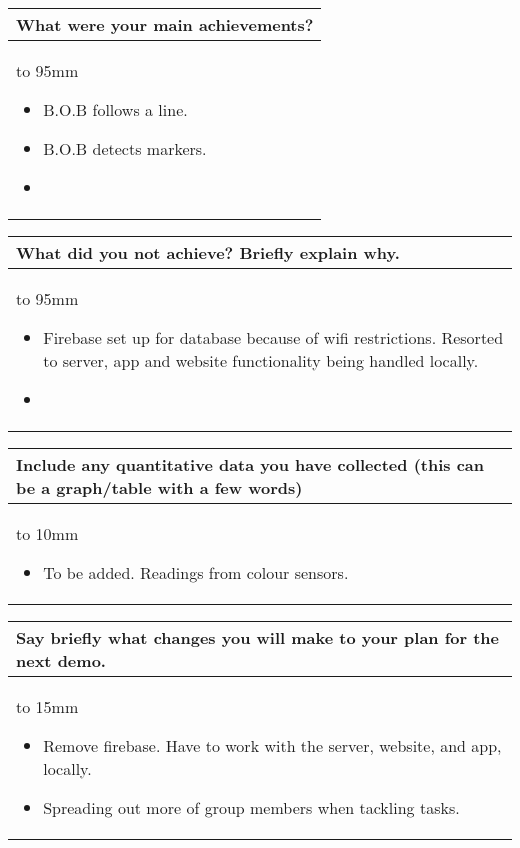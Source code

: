 \documentclass[a4paper]{article}
\newcommand{\colWidth}{141mm}
\begin{document}
\begin{center}

\begin{tabular}{|p{\colWidth}|}
	\hline
	\cellcolor{blue!25}\large
	\textbf{What were your main achievements?}
	\\ \hline
	\vtop to 95mm{
	\begin{itemize}
	    \item B.O.B follows a line. 
	    \item B.O.B detects markers.
	    \item 
	\end{itemize}
  }
  \\
  \hline
\end{tabular}
\vskip 5mm


\begin{tabular}{|p{\colWidth}|}
	\hline
	\cellcolor{blue!25}\large
	\textbf{What did you not achieve? Briefly explain why.}
	\\ \hline
	\vtop to 95mm{
	\begin{itemize}
	    \item Firebase set up for database because of wifi restrictions. Resorted to server, app and website functionality being handled locally.
	    \item 
	\end{itemize}
  }
  \\
  \hline
\end{tabular}
\vskip 5mm


\begin{tabular}{|p{\colWidth}|}
	\hline
	\cellcolor{blue!25}\large
	\textbf{Include any quantitative data you have collected (this can be a graph/table with a few words)}
	\\ \hline
	\vtop to 10mm{
	\begin{itemize}
	    \item To be added. Readings from colour sensors.
	\end{itemize}
  }
  \\
  \hline
\end{tabular}
\vskip 5mm


\begin{tabular}{|p{\colWidth}|}
	\hline
	\cellcolor{blue!25}\large
	\textbf{Say briefly what changes you will make to your plan for the next demo.}
	\\ \hline
	\vtop to 15mm{
	\begin{itemize}
	    \item Remove firebase. Have to work with the server, website, and app, locally.
	    \item Spreading out more of group members when tackling tasks.
	\end{itemize}
  }
  \\
  \hline
\end{tabular}

\end{center}
  
\end{document}
